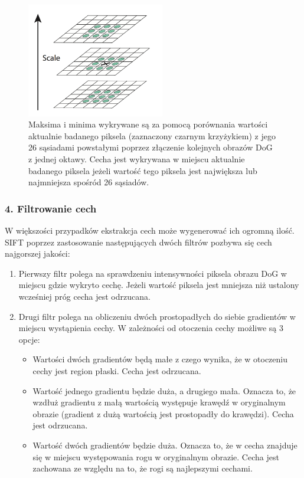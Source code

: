 \begin{figure}[H]
  \centering
  \includegraphics[width=6cm]{gfx/max}
  \caption{\cite{Lowe:2004:DIF:993451.996342} Maksima i minima wykrywane są za pomocą porównania wartości aktualnie badanego piksela (zaznaczony czarnym krzyżykiem) z jego 26 sąsiadami powstałymi poprzez złączenie kolejnych obrazów DoG z jednej oktawy. Cecha jest wykrywana w miejscu aktualnie badanego piksela jeżeli wartość tego piksela jest największa lub najmniejsza spośród 26 sąsiadów.}
  \label{fig:proponowane_algorytmy:max}
\end{figure}

\subsubsection{4. Filtrowanie cech}
\label{sec:proponowane_algorytmy:filtracja_cech}

W większości przypadków ekstrakcja cech może wygenerować ich ogromną ilość. SIFT poprzez zastosowanie następujących dwóch filtrów pozbywa się cech najgorszej jakości:

\begin{enumerate}
\item Pierwszy filtr polega na sprawdzeniu intensywności piksela obrazu DoG w miejscu gdzie wykryto cechę. Jeżeli wartość piksela jest mniejsza niż ustalony wcześniej próg cecha jest odrzucana.
\item Drugi filtr polega na obliczeniu dwóch prostopadłych do siebie gradientów w miejscu wystąpienia cechy. W zależności od otoczenia cechy możliwe są 3 opcje:
  \begin{itemize}
  \item Wartości dwóch gradientów będą małe z czego wynika, że w otoczeniu cechy jest region płaski. Cecha jest odrzucana.
  \item Wartość jednego gradientu będzie duża, a drugiego mała. Oznacza to, że wzdłuż gradientu z małą wartością występuje krawędź w oryginalnym obrazie (gradient z dużą wartością jest prostopadły do krawędzi). Cecha jest odrzucana.
  \item Wartość dwóch gradientów będzie duża. Oznacza to, że w cecha znajduje się w miejscu występowania rogu w oryginalnym obrazie. Cecha jest zachowana ze względu na to, że rogi są najlepszymi cechami.
  \end{itemize}
\end{enumerate}

